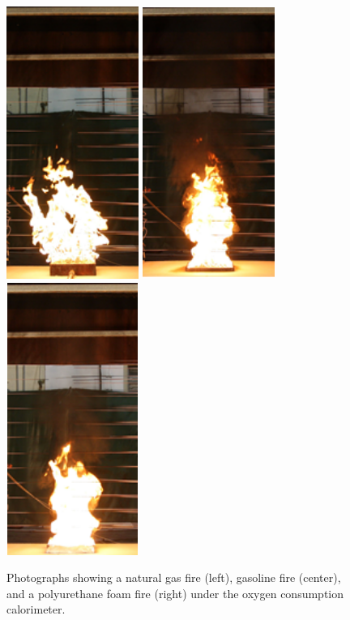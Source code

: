 \documentclass[twoside]{uocthesis}
\begin{document}
{\begin{figure}
  \includegraphics[height=3.5in, width=1.7in]{../Figures/NG_STFire}
  \includegraphics[height=3.5in, width=1.7in]{../Figures/Gaso_STFire} 
  \includegraphics[height=3.5in, width=1.7in]{../Figures/PUF_STFire} \\
  \caption[Photographs of the natural gas, gasoline, and polyurethane foam fires]{Photographs showing a natural gas fire (left), gasoline fire (center), and a polyurethane foam fire (right) under the oxygen consumption calorimeter.}
  \label{Gas_Foam_Photos}
\end{figure}

}
\end{document}
